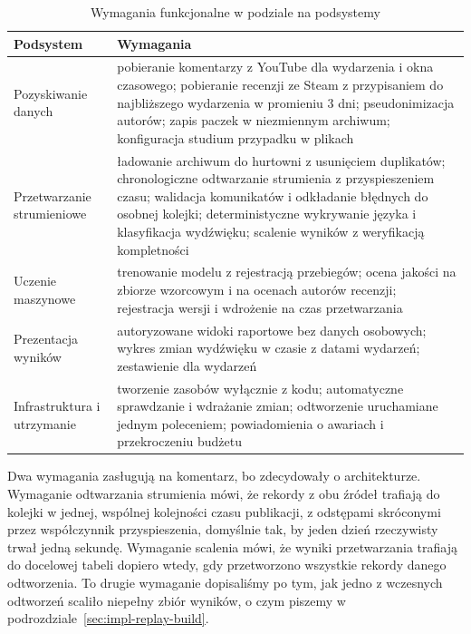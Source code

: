 \begin{table}[hbp]
  \caption{Wymagania funkcjonalne w podziale na podsystemy}
  \label{tab:functional-requirements}
  \centering
  \small
  \begin{tabular}{|p{}|p{}|}
    \hline
    Podsystem                   & Wymagania                                                                                                                                                                                                                                                                      \\
    \hline
    Pozyskiwanie danych         & pobieranie komentarzy z YouTube dla wydarzenia i okna czasowego; pobieranie recenzji ze Steam z przypisaniem do najbliższego wydarzenia w promieniu 3 dni; pseudonimizacja autorów; zapis paczek w niezmiennym archiwum; konfiguracja studium przypadku w plikach              \\
    \hline
    Przetwarzanie strumieniowe  & ładowanie archiwum do hurtowni z usunięciem duplikatów; chronologiczne odtwarzanie strumienia z przyspieszeniem czasu; walidacja komunikatów i odkładanie błędnych do osobnej kolejki; deterministyczne wykrywanie języka i klasyfikacja wydźwięku; scalenie wyników z weryfikacją kompletności \\
    \hline
    Uczenie maszynowe           & trenowanie modelu z rejestracją przebiegów; ocena jakości na zbiorze wzorcowym i na ocenach autorów recenzji; rejestracja wersji i wdrożenie na czas przetwarzania                                                                                                        \\
    \hline
    Prezentacja wyników         & autoryzowane widoki raportowe bez danych osobowych; wykres zmian wydźwięku w czasie z datami wydarzeń; zestawienie dla wydarzeń                                                                                                                                         \\
    \hline
    Infrastruktura i utrzymanie & tworzenie zasobów wyłącznie z kodu; automatyczne sprawdzanie i wdrażanie zmian; odtworzenie uruchamiane jednym poleceniem; powiadomienia o awariach i przekroczeniu budżetu                                                                                              \\
    \hline
  \end{tabular}
\end{table}

Dwa wymagania zasługują na komentarz, bo zdecydowały o architekturze.
Wymaganie odtwarzania strumienia mówi, że rekordy z obu źródeł trafiają do kolejki w jednej, wspólnej kolejności czasu publikacji, z odstępami skróconymi przez współczynnik przyspieszenia, domyślnie tak, by jeden dzień rzeczywisty trwał jedną sekundę.
Wymaganie scalenia mówi, że wyniki przetwarzania trafiają do docelowej tabeli dopiero wtedy, gdy przetworzono wszystkie rekordy danego odtworzenia.
To drugie wymaganie dopisaliśmy po tym, jak jedno z wczesnych odtworzeń scaliło niepełny zbiór wyników, o czym piszemy w podrozdziale~\ref{sec:impl-replay-build}.

